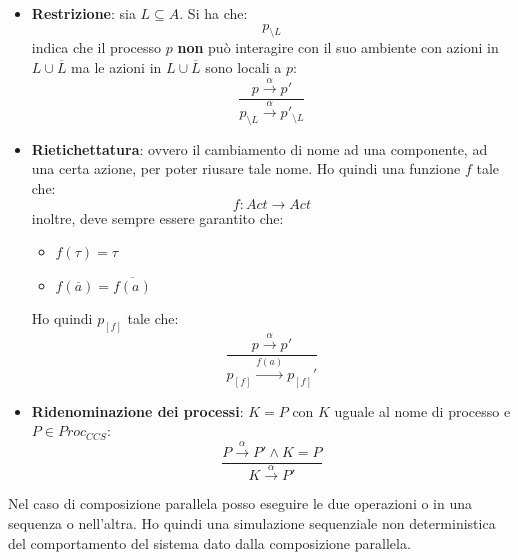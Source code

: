 \begin{itemize}
\begin{center}
          \end{center}
    \item \textbf{Restrizione}: sia $L \subseteq A$. Si ha che:
          \begin{equation}
              p_{\setminus L}
          \end{equation}
          indica che il processo $p$ \textbf{non} può interagire con il suo
          ambiente con azioni in $L \cup \overline{L}$ ma le azioni in
          $L \cup \overline{L}$ sono locali a $p$:
          \begin{equation}
              \frac{p \xrightarrow{\alpha} p'}{ p_{\setminus L}
              \xrightarrow{\alpha} p'_{\setminus L}}
          \end{equation}
    \item \textbf{Rietichettatura}: ovvero il cambiamento di nome ad una componente,
          ad una certa azione, per poter riusare tale nome. Ho quindi una
          funzione $f$ tale che:
          \begin{equation}
              f: Act \to Act
          \end{equation}
          inoltre, deve sempre essere garantito che:
          \begin{itemize}
              \item $f(\tau) = \tau$
              \item $f(\overline{a}) = \overline{f(a)}$
          \end{itemize}
          Ho quindi $p_{[f]}$ tale che:
          \begin{equation}
              \frac{p \xrightarrow{\alpha} p'}{p_{[f]} \xrightarrow{f(a)} p_{[f]}'}
          \end{equation}
    \item \textbf{Ridenominazione dei processi}: $K = P$ con $K$ uguale al nome 
          di processo e $P \in Proc_{CCS}$:
          \begin{equation}
              \frac{P \xrightarrow{\alpha} P' \land K = P}{K \xrightarrow{\alpha} P'}
          \end{equation}
\end{itemize}
Nel caso di composizione parallela posso eseguire le due operazioni o in una
sequenza o nell'altra. Ho quindi una simulazione sequenziale non deterministica
del comportamento del sistema dato dalla composizione parallela.

